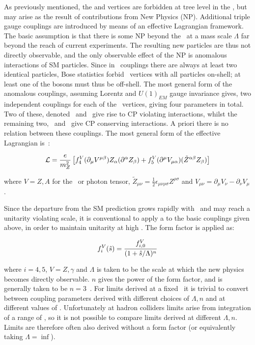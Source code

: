As previously mentioned, the \ZZZ and \ZZg vertices are forbidden at tree level
in the \sm, but may arise as the result of contributions from New Physics (NP).
Additional triple gauge couplings are introduced by means of an effective
Lagrangian framework. The basic assumption is that there is some NP beyond the
\sm\ at a mass scale $\Lambda$ far beyond the reach of current experiments. The resulting
new particles are thus not directly observable, and the only observable effect
of the NP is anomalous interactions of SM particles. Since in \ZZV\ couplings
there are always at least two identical particles, Bose statistics forbid \ZZV\
vertices with all particles on-shell; at least one of the bosons must thus be
off-shell. The most general form of the anomalous couplings, assuming Lorentz
and $U(1)_{EM}$ gauge invariance gives, two independent couplings for each of
the \ZZV\ vertices, giving four parameters in total. Two of these, denoted
\ffourZ\ and \ffourg\ give rise to CP violating interactions, whilst the
remaining two, \ffiveZ\ and \ffiveg\ give CP conserving interactions. A priori
there is no relation between these couplings. The most general form of the effective Lagrangian is~\cite{Gounaris:1999kf}:

\begin{align}
\mathcal{L} = \frac{e}{m_{Z}^{2}} \left[ 
f_{4}^{V}(\partial_{\mu}V^{\mu\beta})Z_{\alpha}(\partial^{\alpha}Z_{\beta}) +
f_{5}^{V}(\partial^{\mu}V_{\mu\alpha})(\tilde{Z}^{\alpha\beta}Z_{\beta}) \right]
\end{align}

where $V=Z,A$ for the \Z\ or photon tensor, $\tilde{Z}_{\mu\nu} = \frac{1}{2}
\epsilon_{\mu\nu\rho\sigma}Z^{\rho\sigma}$ and $V_{\mu\nu} = \partial_{\mu}V_{\nu}
- \partial_{\nu}V_{\mu}$.

Since the departure from the SM prediction grows rapidly with \sqrts\ and may
reach a unitarity violating scale, it is conventional to apply a \intro{form
factor} to the basic couplings given above, in order to maintain unitarity at
high \sqrtshat. The form factor is applied as:

\begin{align}
f_{i}^{V}(\hat{s}) = \frac{f^{V}_{i,0}}{(1 + \hat{s} / \Lambda)^{n}}
\end{align}

where $i=4,5$, $V=Z,\gamma$ and $\Lambda$ is taken to be the scale at which the
new physics becomes directly observable. $n$ gives the power of the form factor,
and is generally taken to be $n=3$~\cite{Baur:2000ae}. For limits derived at a
fixed \shat\ it is trivial to convert between coupling parameters derived with
different choices of $\Lambda,n$ and at different values of \shat. Unfortunately at hadron colliders limits arise
from integration of a range of \shat, so it is not possible to compare
limits derived at different $\Lambda,n$. Limits are therefore often also derived
without a form factor (or equivalently taking $\Lambda = \inf$).



